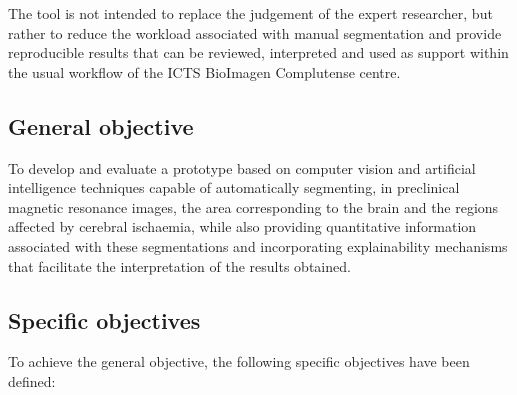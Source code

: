 The tool is not intended to replace the judgement of the expert researcher, but rather to reduce the workload associated with manual segmentation and provide reproducible results that can be reviewed, interpreted and used as support within the usual workflow of the ICTS BioImagen Complutense centre.

\subsection*{General objective}

To develop and evaluate a prototype based on computer vision and artificial intelligence techniques capable of automatically segmenting, in preclinical magnetic resonance images, the area corresponding to the brain and the regions affected by cerebral ischaemia, while also providing quantitative information associated with these segmentations and incorporating explainability mechanisms that facilitate the interpretation of the results obtained.

\subsection*{Specific objectives}

To achieve the general objective, the following specific objectives have been defined:

